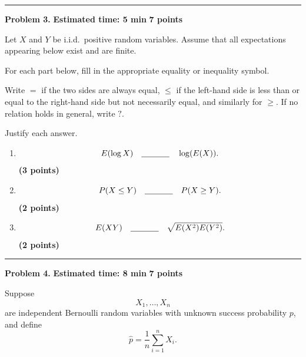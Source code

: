 \documentclass[11pt]{article}
\begin{document}
\hrule



\newpage

\begin{problemheader}
\textbf{Problem 3.}
\hfill
\textbf{Estimated time: 5 min}
\qquad
\textbf{7 points}
\end{problemheader}

Let \(X\) and \(Y\) be i.i.d.\ positive random variables. Assume that all expectations appearing below exist and are finite.

For each part below, fill in the appropriate equality or inequality symbol.

Write \(=\) if the two sides are always equal, \(\leq\) if the left-hand side
is less than or equal to the right-hand side but not necessarily equal, and
similarly for \(\geq\). If no relation holds in general, write \(?\).

Justify each answer.

\begin{enumerate}[label=(\alph*),leftmargin=*,itemsep=1.2em]

    \item
    \[
    E(\log X)
    \quad \underline{\hspace{1.2cm}} \quad
    \log(E(X)).
    \]
    \hfill \textbf{(3 points)}

    \item
    \[
    P(X\leq Y)
    \quad \underline{\hspace{1.2cm}} \quad
    P(X\geq Y).
    \]
    \hfill \textbf{(2 points)}

    \item
    \[
    E(XY)
    \quad \underline{\hspace{1.2cm}} \quad
    \sqrt{E(X^2)E(Y^2)}.
    \]
    \hfill \textbf{(2 points)}

\end{enumerate}

\hrule



\newpage

\begin{problemheader}
\textbf{Problem 4.}
\hfill
\textbf{Estimated time: 8 min}
\qquad
\textbf{7 points}
\end{problemheader}

Suppose
\[
X_1,\ldots,X_n
\]
are independent Bernoulli random variables with unknown success probability
\(p\), and define
\[
\widehat p
=
\frac1n\sum_{i=1}^n X_i.
\]
\end{document}

